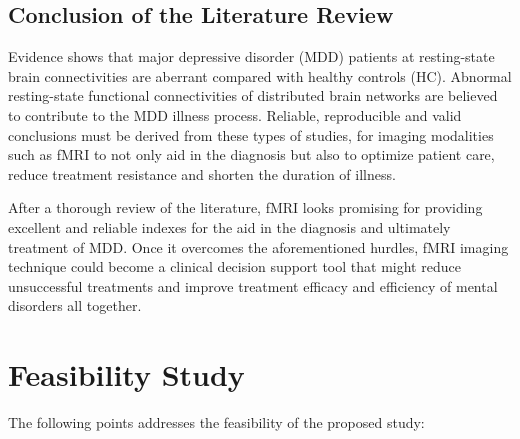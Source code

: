 \documentclass[12pt]{article}
\begin{document}
\subsection*{Conclusion of the Literature Review}

Evidence shows that major depressive disorder (MDD) patients at
resting-state brain connectivities are aberrant compared with healthy
controls (HC). Abnormal resting-state functional connectivities of
distributed brain networks are believed to contribute to the MDD
illness process. Reliable, reproducible and valid conclusions must be
derived from these types of studies, for imaging modalities such as
fMRI to not only aid in the diagnosis but also to optimize patient
care, reduce treatment resistance and shorten the duration of illness.

\vspace{-5pt}
\enlargethispage{\baselineskip}
After a thorough review of the literature, fMRI looks promising for
providing excellent and reliable indexes for the aid in the diagnosis
and ultimately treatment of MDD. Once it overcomes the aforementioned
hurdles, fMRI imaging technique could become a clinical decision
support tool that might reduce unsuccessful treatments and improve
treatment efficacy and efficiency of mental disorders all together.

\newpage
\section{Feasibility Study}

The following points addresses the feasibility of the proposed study:
\end{document}
